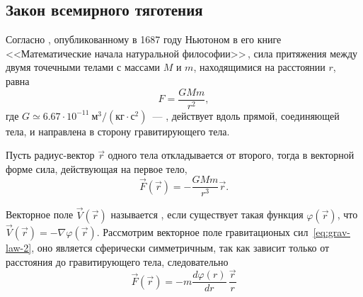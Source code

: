 \subsection{Закон всемирного тяготения}
\label{sec:gravity-law}
Согласно , опубликованному в 1687 году Ньютоном в его книге <<Математические начала натуральной философии>>\,\cite{newton1687philosophiae}\cite{newton1846philosophiaeEnglish}, сила притяжения между двумя точечными телами с массами $M$ и $m$, находящимися на расстоянии $r$, равна
\begin{equation}
    F=\frac{GMm}{r^2},
    \label{eq:grav-law-1}
\end{equation}\nopagebreak где $G\simeq 6.67\cdot 10^{-11}~\text{м}^3 /\left( \text{кг} \cdot \text{с}^2 \right)$~---  , действует вдоль прямой, соединяющей тела, и направлена в сторону гравитирующего тела.

Пусть радиус-вектор $\vec r$ одного тела откладывается от второго, тогда в векторной форме сила, действующая на первое тело,
\begin{equation}
    \vec F (\vec r) = -\frac{GMm}{r^3} \vec r.
    \label{eq:grav-law-2}
\end{equation}

Векторное поле $\vec V (\vec r)$ называется , если существует такая функция $\varphi(\vec r)$, что $\vec V (\vec r) = - \nabla \varphi(\vec r)$. Рассмотрим векторное поле гравитационых сил~\eqref{eq:grav-law-2}, оно является сферически симметричным, так как зависит только от расстояния до гравитирующего тела, следовательно
\begin{equation*}
    \vec F (\vec r) = -m \frac{d\varphi(r)}{dr} \, \frac{\vec{r}}{r}
\end{equation*} 

